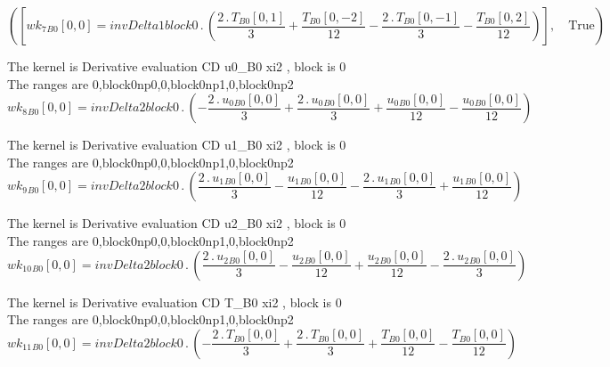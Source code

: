 \documentclass{article}
\begin{document}
\begin{dmath}\left ( \left [ {wk_{7}{_{B0}}}[{0,0}] = invDelta1block0 \,.\, \left(\frac{2 \,.\, {T{_{B0}}}[{0,1}]}{3} + \frac{{T{_{B0}}}[{0,-2}]}{12} - \frac{2 \,.\, {T{_{B0}}}[{0,-1}]}{3} - \frac{{T{_{B0}}}[{0,2}]}{12}\right)\right ], \quad 
\mathrm{True}\right )\end{dmath}

\noindent The kernel is Derivative evaluation CD u0_B0 xi2 , block is 0\\\noindent The ranges are 0,block0np0,0,block0np1,0,block0np2\\\begin{dmath}{wk_{8}{_{B0}}}[{0,0}] = invDelta2block0 \,.\, \left(- \frac{2 \,.\, {u_{0}{_{B0}}}[{0,0}]}{3} + \frac{2 \,.\, {u_{0}{_{B0}}}[{0,0}]}{3} + \frac{{u_{0}{_{B0}}}[{0,0}]}{12} - \frac{{u_{0}{_{B0}}}[{0,0}]}{12}\right)\end{dmath}

\noindent The kernel is Derivative evaluation CD u1_B0 xi2 , block is 0\\\noindent The ranges are 0,block0np0,0,block0np1,0,block0np2\\\begin{dmath}{wk_{9}{_{B0}}}[{0,0}] = invDelta2block0 \,.\, \left(\frac{2 \,.\, {u_{1}{_{B0}}}[{0,0}]}{3} - \frac{{u_{1}{_{B0}}}[{0,0}]}{12} - \frac{2 \,.\, {u_{1}{_{B0}}}[{0,0}]}{3} + \frac{{u_{1}{_{B0}}}[{0,0}]}{12}\right)\end{dmath}

\noindent The kernel is Derivative evaluation CD u2_B0 xi2 , block is 0\\\noindent The ranges are 0,block0np0,0,block0np1,0,block0np2\\\begin{dmath}{wk_{10}{_{B0}}}[{0,0}] = invDelta2block0 \,.\, \left(\frac{2 \,.\, {u_{2}{_{B0}}}[{0,0}]}{3} - \frac{{u_{2}{_{B0}}}[{0,0}]}{12} + \frac{{u_{2}{_{B0}}}[{0,0}]}{12} - \frac{2 \,.\, {u_{2}{_{B0}}}[{0,0}]}{3}\right)\end{dmath}

\noindent The kernel is Derivative evaluation CD T_B0 xi2 , block is 0\\\noindent The ranges are 0,block0np0,0,block0np1,0,block0np2\\\begin{dmath}{wk_{11}{_{B0}}}[{0,0}] = invDelta2block0 \,.\, \left(- \frac{2 \,.\, {T{_{B0}}}[{0,0}]}{3} + \frac{2 \,.\, {T{_{B0}}}[{0,0}]}{3} + \frac{{T{_{B0}}}[{0,0}]}{12} - \frac{{T{_{B0}}}[{0,0}]}{12}\right)\end{dmath}
\end{document}
